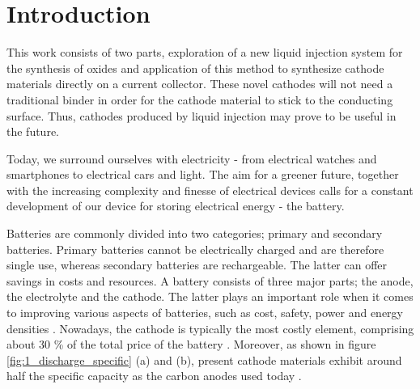 \documentclass[Main/main.tex]{subfiles}
\begin{document}
 \section{Introduction}



This work consists of two parts, exploration of a new liquid injection system for the synthesis of oxides and application of this method to synthesize cathode materials directly on a current collector. These novel cathodes will not need a traditional binder in order for the cathode material to stick to the conducting surface. Thus, cathodes produced by liquid injection may prove to be useful in the future.


Today, we surround ourselves with electricity - from electrical watches and smartphones to electrical cars and light. The aim for a greener future, together with the increasing complexity and finesse of electrical devices calls for a constant development of our device for storing electrical energy - the battery.

Batteries are commonly divided into two categories; primary and secondary batteries. Primary batteries cannot be electrically charged and are therefore single use, whereas secondary batteries are rechargeable. The latter can offer savings in costs and resources. A battery consists of three major parts; the anode, the electrolyte and the cathode. The latter plays an important role when it comes to improving various aspects of batteries, such as cost, safety, power and energy densities \cite{gandrud}. Nowadays, the cathode is typically the most costly element, comprising about 30 \% of the total price of the battery \cite{costcath}. Moreover, as shown in figure \ref{fig:1_discharge_specific} (a) and (b), present cathode materials exhibit around half the specific capacity as the carbon anodes used today \cite{1_rev_liion}.
\end{document}
